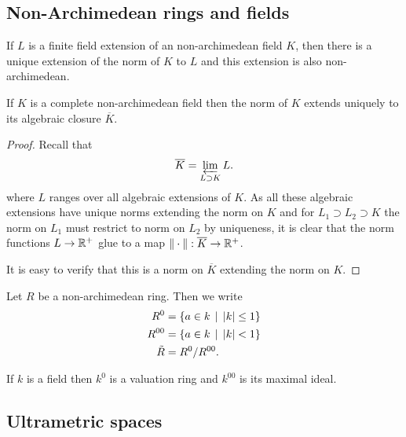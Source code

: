 \subsection{Non-Archimedean rings and fields} \label{sec:non-archimedean_rings_and_fields}


\begin{theorem}\label{thm:norm_finite_field_ext}
	If $L$ is a finite  field extension of an non-archimedean field $K$, then there is a unique extension of the norm of $K$ to $L$ and this extension is also non-archimedean.
\end{theorem}

\begin{corollary}
	If $K$ is a complete non-archimedean field then the norm of  $K$ extends uniquely to its algebraic closure $\overline{K}$.
\end{corollary}
\begin{proof}
	Recall that \[
	\overline{K} = \varprojlim_{L \supset K} L
	.\] 
	where $L$ ranges over all algebraic extensions of $K$. 
	As all these algebraic extensions have unique norms extending  the norm on $K$ and for $L_1 \supset L_2 \supset K$ the norm on  $L_1$ must restrict to norm on $L_2$ by uniqueness, it is clear that the norm functions $L \to \mathbb{R}^{+}$ glue to a map $\|\cdot \|: \overline{K} \to \mathbb{R}^{+}$. 

	It is easy to verify that this is a norm on $\overline{K}$ extending the norm on $K$. 
\end{proof}

\begin{definition}
	Let $R$ be a non-archimedean ring. Then we write 
	\begin{align*}
		R^{0} &= \{a \in k \st |k| \le 1\}  \\
		R^{00} &=  \{a \in k \st |k| < 1\}  \\
		\tilde R &= R^{0} / R^{00}
	.\end{align*}
\end{definition}
If $k$ is a field then $k^{0}$ is a valuation ring and $ k^{00}$ is its maximal ideal. 

\subsection{Ultrametric spaces} \label{sec:ultrametric_spaces}

